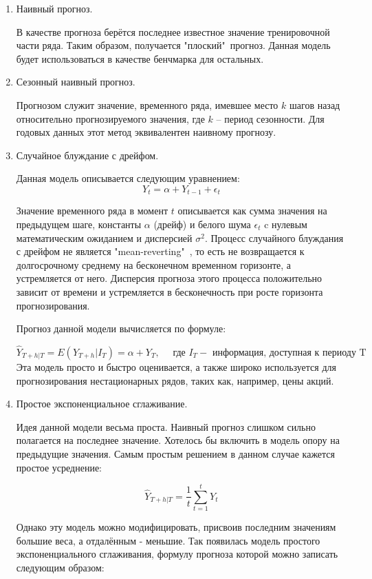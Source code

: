 \documentclass[a4paper,12pt]{article}
\begin{document}
 \begin{enumerate}
	 \item Наивный прогноз.
	 
	  В качестве прогноза берётся последнее известное значение тренировочной части ряда. Таким образом, получается "плоский"\ прогноз. Данная модель будет использоваться в качестве бенчмарка для остальных.
	 
	 \item Сезонный наивный прогноз.
	 
	 Прогнозом служит значение, временного ряда, имевшее место $ k $ шагов назад относительно прогнозируемого значения, где $ k $ -- период сезонности. Для годовых данных этот метод эквивалентен наивному прогнозу.
	 
	 \item Случайное блуждание с дрейфом.
	 
	 Данная модель описывается следующим уравнением:
	 \[ Y_t = \alpha + Y_{t-1} + \epsilon_t \]
	 
	 Значение временного ряда в момент $ t $ описывается как сумма значения на предыдущем шаге, константы $ \alpha $ (дрейф) и белого шума $ \epsilon_t $ c нулевым математическим ожиданием и дисперсией $ \sigma^2 $. Процесс случайного блуждания с дрейфом не является "mean-reverting"\ , то есть не возвращается к долгосрочному среднему на бесконечном временном горизонте, а устремляется от него. Дисперсия прогноза этого процесса положительно зависит от времени и устремляется в бесконечность при росте горизонта прогнозирования. 	
	 
	 Прогноз данной модели вычисляется по формуле:
	 
	 \[ \hat{Y}_{T+h| T} = E(Y_{T+h} | I_T) = \alpha + Y_T, \quad \text{ где } I_T - \text{ информация, доступная к периоду T}\]
	 Эта модель просто и быстро оценивается, а также широко используется для прогнозирования нестационарных рядов, таких как, например, цены акций.  
	 
	 \item Простое экспоненциальное сглаживание.
	 
	 Идея данной модели весьма проста. Наивный прогноз слишком сильно полагается на последнее значение. Хотелось бы включить в модель опору на предыдущие значения. Самым простым решением в данном случае кажется простое усреднение:
	 
	 \[   \hat{Y}_{T+h| T} = \frac{1}{t}\sum_{t = 1}^{t}Y_t\]
	 
	 Однако эту модель можно модифицировать, присвоив последним значениям большие веса, а отдалённым - меньшие. Так появилась модель простого экспоненциального сглаживания, формулу прогноза которой можно записать следующим образом: 
	 

\end{enumerate}
\end{document}
